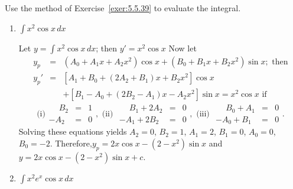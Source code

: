 \documentclass{ximera}
\begin{document}
\begin{problem}\label{exer:5.5.40}
Use the method of Exercise~\ref{exer:5.5.39} to evaluate the integral.

\begin{enumerate}
    
\item  $\int x^2\cos x\,dx$ 

\begin{solution}
    Let $y=\int x^2\cos x\,dx$; then
$y'=x^2\cos x$ Now let
\begin{eqnarray*}
y_p&=&(A_0+A_1x+A_2x^2)\cos x +(B_0+B_1x+B_2x^2)\sin x;\mbox{ then}\\
y_p'&=&\left[A_1+B_0+(2A_2+B_1)x+B_2x^2\right]\cos x\\  &&
+\left[B_1-A_0+(2B_2-A_1)x-A_2x^2\right]\sin x
=x^2\cos x \mbox{ if}
\end{eqnarray*}
$$
\mbox{(i)}
\begin{array}{rcl} \phantom{-}B_2&=&1\\ -A_2&=&0 \end{array},
\mbox{ (ii) }
\begin{array}{rcl}
\phantom{-}B_1+2A_2&=&0\\ -A_1+2B_2&=&0\end{array},
\mbox{ (iii) }
\begin{array}{rcl} \phantom{-}B_0+A_1&=&0\\ -A_0+B_1&=&0
\end{array}.
$$
Solving these equations yields $A_2=0$, $B_2=1$, $A_1=2$, $B_1=0$,
$A_0=0$, $B_0=-2$. Therefore,$y_p=2x\cos x-(2-x^2)\sin x$ and
$y=2x\cos x-(2-x^2)\sin x+c$.
\end{solution}

\item  $\int x^2e^x\cos x\,dx$ 


\end{enumerate}
\end{problem}
\end{document}
